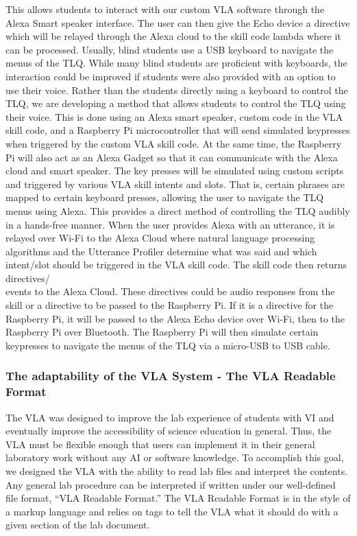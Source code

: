 \documentclass[11.5pt]{sig-alternate} %
\begin{document}
\begin{large}
This allows students to interact with our custom VLA software through the Alexa Smart speaker interface. The user can then give the Echo device a directive which will be relayed through the Alexa cloud to the skill code lambda where it can be processed. Usually, blind students use a USB keyboard to navigate the menus of the TLQ. While many blind students are proficient with keyboards, the interaction could be improved if students were also provided with an option to use their voice. Rather than the students directly using a keyboard to control the TLQ, we are developing a method that allows students to control the TLQ using their voice. This is done using an Alexa smart speaker, custom code in the VLA skill code, and a Raspberry Pi microcontroller that will send simulated keypresses when triggered by the custom VLA skill code. At the same time, the Raspberry Pi will also act as an Alexa Gadget so that it can communicate with the Alexa cloud and smart speaker. The key presses will be simulated using custom scripts and triggered by various VLA skill intents and slots. That is, certain phrases are mapped to certain keyboard presses, allowing the user to navigate the TLQ menus using Alexa. This provides a direct method of controlling the TLQ audibly in a hands-free manner. When the user provides Alexa with an utterance, it is relayed over Wi-Fi to the Alexa Cloud where natural language processing algorithms and the Utterance Profiler determine what was said and which intent/slot should be triggered in the VLA skill code. The skill code then returns directives/\\events to the Alexa Cloud. These directives could be audio responses from the skill or a directive to be passed to the Raspberry Pi. If it is a directive for the Raspberry Pi, it will be passed to the Alexa Echo device over Wi-Fi, then to the Raspberry Pi over Bluetooth. The Raspberry Pi will then simulate certain keypresses to navigate the menus of the TLQ via a micro-USB to USB cable.

\subsubsection*{The adaptability of the VLA System - The VLA Readable Format}

The VLA was designed to improve the lab experience of students with VI and eventually improve the accessibility of science education in general. Thus, the VLA must be flexible enough that users can implement it in their general laboratory work without any AI or software knowledge. To accomplish this goal, we designed the VLA with the ability to read lab files and interpret the contents. Any general lab procedure can be interpreted if written under our well-defined file format, “VLA Readable Format.” The VLA Readable Format is in the style of a markup language and relies on tags to tell the VLA what it should do with a given section of the lab document.


\end{large}
\end{document}
